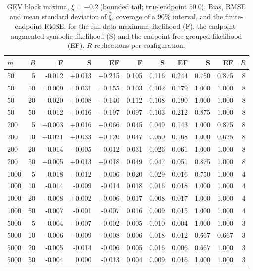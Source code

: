 \begin{table}[t]
\centering
\small
\caption{GEV block maxima, $\xi=-0.2$ (bounded tail; true endpoint $50.0$). Bias, RMSE and mean standard deviation of $\hat\xi$, coverage of a $90\%$ interval, and the finite-endpoint RMSE, for the full-data maximum likelihood (F), the endpoint-augmented symbolic likelihood (S) and the endpoint-free grouped likelihood (EF). $R$ replications per configuration.}
\label{tab:sim-gev}
\begin{tabular}{lrrrrrrrrrr}
\toprule
$m$ & $B$ & F & S & EF & F & S & EF & S & EF & $R$ \\
\midrule
  50 &    5 & -0.012 & +0.013 & +0.215 & 0.105 & 0.116 & 0.244 & 0.750 & 0.875 &    8 \\
  50 &   10 & +0.009 & +0.031 & +0.155 & 0.103 & 0.102 & 0.179 & 1.000 & 1.000 &    8 \\
  50 &   20 & -0.020 & +0.008 & +0.140 & 0.112 & 0.108 & 0.190 & 1.000 & 1.000 &    8 \\
  50 &   50 & -0.012 & +0.016 & +0.197 & 0.097 & 0.103 & 0.212 & 0.875 & 1.000 &    8 \\
 200 &    5 & +0.003 & +0.016 & +0.066 & 0.045 & 0.049 & 0.143 & 1.000 & 0.875 &    8 \\
 200 &   10 & +0.021 & +0.033 & +0.120 & 0.047 & 0.050 & 0.168 & 1.000 & 0.625 &    8 \\
 200 &   20 & -0.014 & -0.005 & +0.012 & 0.031 & 0.026 & 0.061 & 1.000 & 1.000 &    8 \\
 200 &   50 & +0.005 & +0.013 & +0.018 & 0.049 & 0.047 & 0.051 & 0.875 & 1.000 &    8 \\
1000 &    5 & -0.018 & -0.012 & -0.006 & 0.020 & 0.029 & 0.016 & 0.750 & 1.000 &    4 \\
1000 &   10 & -0.014 & -0.009 & -0.014 & 0.018 & 0.016 & 0.018 & 1.000 & 1.000 &    4 \\
1000 &   20 & -0.008 & +0.002 & -0.006 & 0.017 & 0.008 & 0.017 & 1.000 & 1.000 &    4 \\
1000 &   50 & -0.007 & -0.001 & -0.007 & 0.016 & 0.009 & 0.015 & 1.000 & 1.000 &    4 \\
5000 &    5 & -0.004 & -0.007 & -0.002 & 0.005 & 0.010 & 0.004 & 1.000 & 1.000 &    3 \\
5000 &   10 & -0.006 & -0.009 & -0.008 & 0.006 & 0.018 & 0.012 & 0.667 & 0.667 &    3 \\
5000 &   20 & -0.005 & -0.014 & -0.006 & 0.005 & 0.016 & 0.006 & 0.667 & 1.000 &    3 \\
5000 &   50 & -0.004 & 0.000 & -0.013 & 0.004 & 0.009 & 0.016 & 1.000 & 1.000 &    3 \\
\bottomrule
\end{tabular}
\end{table}
